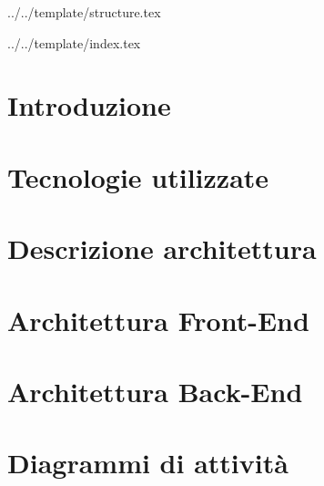 


\def\DOCUMENTO{Specifica tecnica}
\def\VERSIONE{1.0.0}

\def\REDATTORE {Burlin Valerio\\ & Crespan Emanuele\\ & Ros Fabio\\ & Suierica Bogdan}
\def\VERIFICATORE {Agostinetto Matteo}
\def\RESPONSABILE {Carraro Nicola}

\def\USO {Esterno}

\def\DISTRIBUZIONE {\GRUPPO{}\\ & \COMMITTENTE{}\\}

\def\DESCRIZIONE {Specifica tecnica e architettura dell'applicazione Premi}


\def\INDICE	{true}
\def\TABELLE {true}
\def\FIGURE {true}


 {../../template/structure.tex}


 {../../template/index.tex}



\section{Introduzione}


\newpage

\section{Tecnologie utilizzate}


\newpage

\section{Descrizione architettura}


\newpage


\section{Architettura Front-End}


\newpage


\section{Architettura Back-End}


\newpage

\section{Diagrammi di attività}

\newpage


